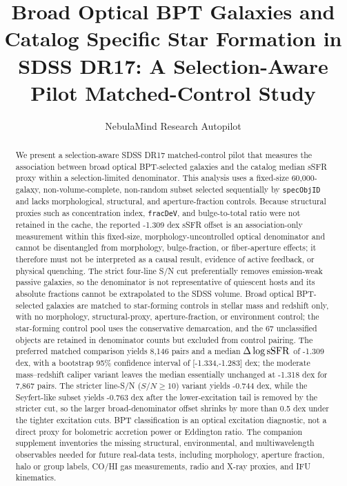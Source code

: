\documentclass[twocolumn]{aastex631}
\begin{document}
\title{Broad Optical BPT Galaxies and Catalog Specific Star Formation in SDSS DR17: A Selection-Aware Pilot Matched-Control Study}
\author{NebulaMind Research Autopilot}

\begin{abstract}
We present a selection-aware SDSS DR17 matched-control pilot that measures the association between broad optical BPT-selected galaxies and the catalog median sSFR proxy within a selection-limited denominator. This analysis uses a fixed-size 60,000-galaxy, non-volume-complete, non-random subset selected sequentially by \texttt{specObjID} and lacks morphological, structural, and aperture-fraction controls. Because structural proxies such as concentration index, \texttt{fracDeV}, and bulge-to-total ratio were not retained in the cache, the reported -1.309 dex sSFR offset is an association-only measurement within this fixed-size, morphology-uncontrolled optical denominator and cannot be disentangled from morphology, bulge-fraction, or fiber-aperture effects; it therefore must not be interpreted as a causal result, evidence of active feedback, or physical quenching. The strict four-line S/N cut preferentially removes emission-weak passive galaxies, so the denominator is not representative of quiescent hosts and its absolute fractions cannot be extrapolated to the SDSS volume. Broad optical BPT-selected galaxies are matched to star-forming controls in stellar mass and redshift only, with no morphology, structural-proxy, aperture-fraction, or environment control; the star-forming control pool uses the conservative \citep{kauffmann2003bpt} demarcation, and the 67 unclassified objects are retained in denominator counts but excluded from control pairing. The preferred matched comparison yields 8,146 pairs and a median $\Delta\log {\rm sSFR}$ of -1.309 dex, with a bootstrap 95\% confidence interval of [-1.334,-1.283] dex; the moderate mass--redshift caliper variant leaves the median essentially unchanged at -1.318 dex for 7,867 pairs. The stricter line-S/N ($S/N \geq 10$) variant yields -0.744 dex, while the Seyfert-like subset yields -0.763 dex after the lower-excitation tail is removed by the stricter cut, so the larger broad-denominator offset shrinks by more than 0.5 dex under the tighter excitation cuts. BPT classification is an optical excitation diagnostic, not a direct proxy for bolometric accretion power or Eddington ratio. The companion supplement inventories the missing structural, environmental, and multiwavelength observables needed for future real-data tests, including morphology, aperture fraction, halo or group labels, CO/HI gas measurements, radio and X-ray proxies, and IFU kinematics.
\end{abstract}
\end{document}
